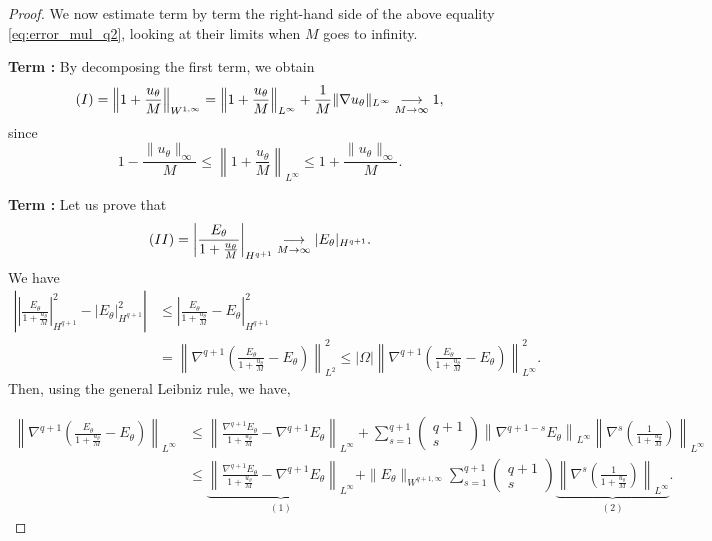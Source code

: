 \begin{proof}
	We now estimate term by term the right-hand side of the
	above equality \eqref{eq:error_mul_q2}, looking at their
	limits when $M$ goes to infinity.

	\textbf{Term \MakeUppercase{}:} By decomposing the first term, we obtain
	\[
		(\MakeUppercase{\romannumeral 1})=\left\|1+\frac{u_\theta}{M}\right\|_{W^{1,\infty}}=\left\|1+\frac{u_\theta}{M}\right\|_{L^\infty} + \frac{1}{M}\|\nabla u_\theta\|_{L^\infty}\underset{M\to\infty}{\longrightarrow} 1,
	\]
	since
	\begin{equation}\label{eq:plus_d_idee_de_label}
		1-\frac{\|u_\theta\|_{\infty}}{M}
		\le
		\left\|1+\frac{u_\theta}{M}\right\|_{L^\infty}
		\le
		1+\frac{\|u_\theta\|_{\infty}}{M}.
	\end{equation}


	\textbf{Term \MakeUppercase{}:}
	Let us prove that
	\begin{equation*}
	(\MakeUppercase{\romannumeral 2})=	\left|\frac{E_\theta}{1+\frac{u_\theta}{M}}\right|_{H^{q+1}}\underset{M\rightarrow\infty}{\longrightarrow} |E_\theta|_{H^{q+1}}.
	\end{equation*}
	We have
	\begin{align*}
		\left|\left|\frac{E_\theta}{1+\frac{u_\theta}{M}}\right|_{H^{q+1}}^2-|E_\theta|_{H^{q+1}}^2\right| & \le \left|\frac{E_\theta}{1+\frac{u_\theta}{M}}-E_\theta\right|_{H^{q+1}}^2                                    \\
		& = \left\|\nabla^{q+1}\left(\frac{E_\theta}{1+\frac{u_\theta}{M}}-E_\theta\right)\right\|_{L^2}^2
		\leqslant |\Omega| \left\|\nabla^{q+1}\left(\frac{E_\theta}{1+\frac{u_\theta}{M}}-E_\theta\right)\right\|_{L^\infty}^2.
	\end{align*}
	Then, using the general Leibniz rule, we have,


    \begin{align*}
		\left\|\nabla^{q+1}\left(\frac{E_\theta}{1+\frac{u_\theta}{M}}-E_\theta\right)\right\|_{L^\infty} & \leqslant
		\left\|\frac{\nabla^{q+1}E_\theta}{1+\frac{u_\theta}{M}}-\nabla^{q+1}E_\theta\right\|_{L^\infty}
		+\sum_{s=1}^{q+1} \begin{pmatrix} q+1 \\ s \end{pmatrix}
		\left\|\nabla^{q+1-s}E_\theta\right\|_{L^{\infty}}\left\|\nabla^{s}\left(\frac{1}{1+\frac{u_\theta}{M}}\right)\right\|_{L^\infty} \\
		& \leqslant
		\underbrace{ \left\|\frac{\nabla^{q+1}E_\theta}{1+\frac{u_\theta}{M}}-\nabla^{q+1}E_\theta\right\|_{L^\infty} }_{(1)}
		+\|E_\theta\|_{W^{q+1,{\infty}}} \sum_{s=1}^{q+1} \begin{pmatrix} q+1 \\ s \end{pmatrix}
		\underbrace{ \left\|\nabla^{s}\left(\frac{1}{1+\frac{u_\theta}{M}}\right)\right\|_{L^\infty} }_{(2)} .
	\end{align*}


\end{proof}
